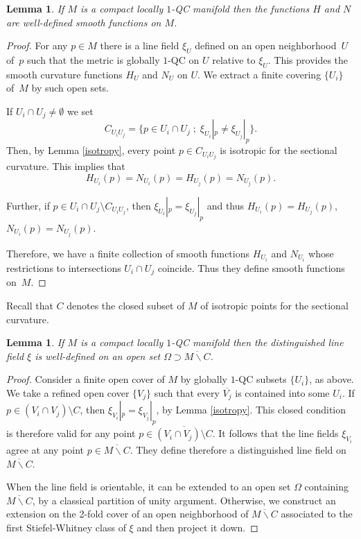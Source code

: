 \documentclass[10pt]{amsart}
\let\moins\smallsetminus
\newcommand{\sep}{\;;\;}
\newtheorem{lemma}[theorem]{Lemma}
\theoremstyle{definition}
\theoremstyle{remark}
\numberwithin{equation}{section}
\begin{document}
\begin{lemma}\label{local-isotrop}
If $M$ is a compact locally $1$-QC manifold then the functions $H$ and $N$ are well-defined smooth functions on $M$.
\end{lemma}
\begin{proof}
For any $p\in M$ there is a line field $\xi_U$ defined on an open neighborhood~$U$ of~$p$
such that the metric is globally $1$-QC on $U$ relative to $\xi_U$. This provides
the smooth curvature functions $H_U$ and $N_U$ on $U$.
We extract a finite covering $\{U_i\}$ of~$M$ by such open sets.

If $U_i\cap U_j\neq \emptyset$ we set
\[C_{U_iU_j}=\{p\in U_i\cap U_j\sep \xi_{U_i}|_p \neq \xi_{U_j}|_p\}.\]
Then, by Lemma \ref{isotropy}, every point $p\in C_{U_iU_j}$
is isotropic for the sectional curvature. This implies that
\[ H_{U_i}(p)=N_{U_i}(p)=H_{U_j}(p)=N_{U_j}(p).\]

Further, if $p\in U_i\cap U_j\setminus C_{U_iU_j}$, then $\xi_{U_i}|_p = \xi_{U_j}|_p$ and thus
$H_{U_i}(p)=H_{U_j}(p)$, $N_{U_i}(p)=N_{U_j}(p)$.

Therefore, we have a finite collection of smooth functions $H_{U_i}$ and $N_{U_i}$ whose restrictions
to intersections $U_i\cap U_j$ coincide. Thus they define smooth functions on~$M$.
\end{proof}

Recall that $C$ denotes the closed subset of $M$ of isotropic points for the sectional curvature.

\begin{lemma}\label{local-line}
If $M$ is a compact locally $1$-QC manifold then the distinguished line field $\xi$
is well-defined on an open set $\Omega \supset \overline{M\moins C}$.
\end{lemma}
\begin{proof}
Consider a finite open cover of $M$ by globally $1$-QC subsets $\{U_i\}$, as above.
We take a refined open cover $\{V_j\}$ such that every $\overline{V_j}$ is contained into some $U_i$.
If $p\in (V_i\cap V_j)\setminus C$, then $\xi_{V_i}|_p=\xi_{V_j}|_p$, by Lemma \ref{isotropy}.
This closed condition is therefore valid for any point $p\in \overline{(V_i\cap V_j)\setminus C}$.
It follows that the line fields $\xi_{V_i}$ agree at any point $p\in \overline{M\moins C}$. They define therefore
a distinguished line field on $\overline{M\moins C}$.

When the line field is orientable, it can be extended to an open set $\Omega$ containing $\overline{M\moins C}$, by a
classical partition of unity argument. Otherwise, we construct an exten\-sion on the 2-fold cover of an open neighborhood
of $\overline{M\moins C}$ associated to the first Stiefel-Whitney class of $\xi$ and then project it down.
\end{proof}
\end{document}
